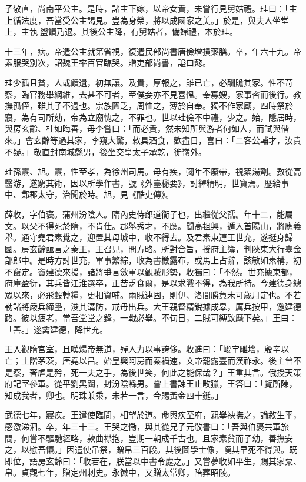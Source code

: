 \begin{pinyinscope}
 子敬直，尚南平公主。是時，諸主下嫁，以帝女貴，未嘗行見舅姑禮。珪曰：「主上循法度，吾當受公主謁見。豈為身榮，將以成國家之美。」於是，與夫人坐堂上，主執盥饋乃退。其後公主降，有舅姑者，備婦禮，本於珪。



 十三年，病。帝遣公主就第省視，復遣民部尚書唐儉增損藥膳。卒，年六十九。帝素服哭別次，詔魏王率百官臨哭。贈吏部尚書，謚曰懿。



 珪少孤且貧，人或饋遺，初無讓。及貴，厚報之，雖已亡，必酬贍其家。性不苛察，臨官務舉綱維，去甚不可者，至僕妾亦不見喜慍。奉寡嫂，家事咨而後行。教撫孤侄，雖其子不過也。宗族匱乏，周恤之，薄於自奉。獨不作家廟，四時祭於寢，為有司所劾，帝為立廟愧之，不罪也。世以珪儉不中禮，少之。始，隱居時，與房玄齡、杜如晦善，母李嘗曰：「而必貴，然未知所與游者何如人，而試與偕來。」會玄齡等過其家，李窺大驚，敕具酒食，歡盡日，喜曰：「二客公輔才，汝貴不疑。」敬直封南城縣男，後坐交皇太子承乾，徙嶺外。



 珪孫燾、旭。燾，性至孝，為徐州司馬。母有疾，彌年不廢帶，視絮湯劑。數從高醫游，遂窮其術，因以所學作書，號《外臺秘要》，討繹精明，世寶焉。歷給事中、鄴郡太守，治聞於時。旭，見《酷吏傳》。



 薛收，字伯褒。蒲州汾陰人。隋內史侍郎道衡子也，出繼從父孺。年十二，能屬文。以父不得死於隋，不肯仕。郡舉秀才，不應。聞高祖興，遁入首陽山，將應義舉。通守堯君素覺之，迎置其母城中，收不得去。及君素東連王世充，遂挺身歸國。房玄齡亟言之秦王，王召見，問方略。所對合旨，授府主簿，判陜東大行臺金部郎中。是時方討世充，軍事繁綜，收為書檄露布，或馬上占辭，該敏如素構，初不竄定。竇建德來援，諸將爭言斂軍以觀賊形勢，收獨曰：「不然。世充據東都，府庫盈衍，其兵皆江淮選卒，正苦乏食爾，是以求戰不得，為我所持。今建德身總眾以來，必飛轂轉糧，更相資哺。兩賊連固，則伊、洛間勝負未可歲月定也。不若勒諸將嚴兵締壘，浚其溝防，戒毋出兵。大王親督精銳據成皋，厲兵按甲，邀建德路。彼以疲老，當吾堂堂之鋒，一戰必舉。不旬日，二賊可縛致麾下矣。」王曰：「善。」遂禽建德，降世充。



 王入觀隋宮室，且嘆煬帝無道，殫人力以事誇侈。收進曰：「峻宇雕墻，殷辛以亡；土階茅茨，唐堯以昌。始皇興阿房而秦禍速，文帝罷露臺而漢祚永。後主曾不是察，奢虐是矜，死一夫之手，為後世笑，何此之能保哉？」王重其言。俄授天策府記室參軍。從平劉黑闥，封汾陰縣男。嘗上書諫王止畋獵，王答曰：「覽所陳，知成我者，卿也。明珠兼乘，未若一言，今賜黃金四十鋌。」



 武德七年，寢疾。王遣使臨問，相望於道。命輿疾至府，親舉袂撫之，論敘生平，感激涕泗。卒，年三十三。王哭之慟，與其從兄子元敬書曰：「吾與伯褒共軍旅間，何嘗不驅馳經略，款曲襟抱，豈期一朝成千古也。且家素貧而子幼，善撫安之，以慰吾懷。」因遣使吊祭，贈帛三百段。其後圖學士像，嘆其早死不得與。既即位，語房玄齡曰：「收若在，朕當以中書令處之。」又嘗夢收如平生，賜其家粟、帛。貞觀七年，贈定州刺史。永徽中，又贈太常卿，陪葬昭陵。




\end{pinyinscope}
